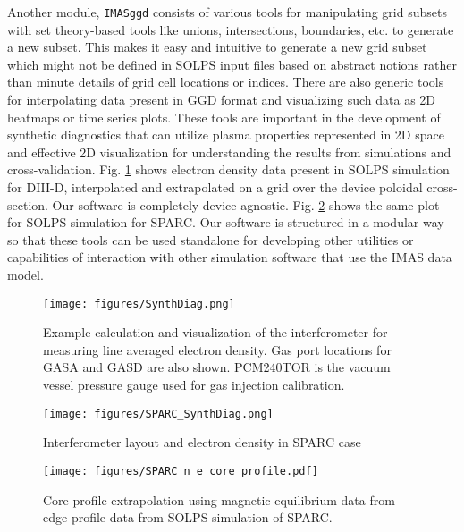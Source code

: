 Another module, \texttt{IMASggd} consists of various tools for manipulating grid subsets with set theory-based tools like unions, intersections, boundaries, etc. to generate a new subset.
This makes it easy and intuitive to generate a new grid subset which might not be defined in SOLPS input files based on abstract notions rather than minute details of grid cell locations or indices.
There are also generic tools for interpolating data present in \ac{GGD} format and visualizing such data as 2D heatmaps or time series plots. These tools are important in the development of synthetic diagnostics that can utilize plasma properties represented in 2D space and effective 2D visualization for understanding the results from simulations and cross-validation. Fig. \ref{fig:interferometer} shows electron density data present in SOLPS simulation for DIII-D, interpolated and extrapolated on a grid over the device poloidal cross-section.
Our software is completely device agnostic. Fig. \ref{fig:sparc_interferometer} shows the same plot for SOLPS simulation for SPARC\cite{Lore2024}. 
Our software is structured in a modular way so that these tools can be used standalone for developing other utilities or capabilities of interaction with other simulation software that use the IMAS data model.

\begin{figure}[!h]
 \centering
 \texttt{[image: figures/SynthDiag.png]}
 \caption{Example calculation and visualization of the interferometer for measuring line averaged electron density. Gas port locations for GASA and GASD are also shown. PCM240TOR is the vacuum vessel pressure gauge used for gas injection calibration.}
 \label{fig:interferometer}
\end{figure}

\begin{figure}[!h]
 \centering
 \texttt{[image: figures/SPARC\_SynthDiag.png]}
 \caption{Interferometer layout and electron density in SPARC\cite{Lore2024} case}
 \label{fig:sparc_interferometer}
\end{figure}


\begin{figure}[!h]
 \centering
 \texttt{[image: figures/SPARC\_n\_e\_core\_profile.pdf]}
 \caption{Core profile extrapolation using magnetic equilibrium data from edge profile data from SOLPS simulation of SPARC\cite{Lore2024}.}
 \label{fig:core_profile}
\end{figure}

